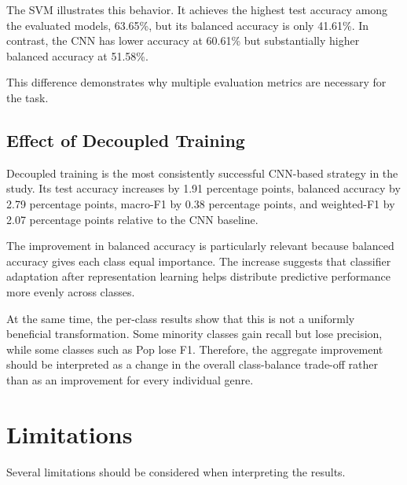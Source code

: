 \documentclass[11pt,a4paper]{article}
\begin{document}
The SVM illustrates this behavior. It achieves the highest test accuracy among the evaluated models, 63.65\%, but its balanced accuracy is only 41.61\%. In contrast, the CNN has lower accuracy at 60.61\% but substantially higher balanced accuracy at 51.58\%.

This difference demonstrates why multiple evaluation metrics are necessary for the task.

\subsection{Effect of Decoupled Training}

Decoupled training is the most consistently successful CNN-based strategy in the study. Its test accuracy increases by 1.91 percentage points, balanced accuracy by 2.79 percentage points, macro-F1 by 0.38 percentage points, and weighted-F1 by 2.07 percentage points relative to the CNN baseline.

The improvement in balanced accuracy is particularly relevant because balanced accuracy gives each class equal importance. The increase suggests that classifier adaptation after representation learning helps distribute predictive performance more evenly across classes.

At the same time, the per-class results show that this is not a uniformly beneficial transformation. Some minority classes gain recall but lose precision, while some classes such as Pop lose F1. Therefore, the aggregate improvement should be interpreted as a change in the overall class-balance trade-off rather than as an improvement for every individual genre.

\section{Limitations}

Several limitations should be considered when interpreting the results.
\end{document}
